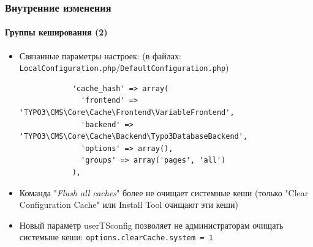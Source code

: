 \begin{frame}[fragile]
	\frametitle{Внутренние изменения}
	\framesubtitle{Группы кеширования (2)}

	\lstset{
		basicstyle=\tiny\ttfamily
	}

	\begin{itemize}

		\item Связанные параметры настроек:\newline
			\smaller(в файлах: \texttt{LocalConfiguration.php}/\texttt{DefaultConfiguration.php})\normalsize

			\begin{lstlisting}
			'cache_hash' => array(
			  'frontend' => 'TYPO3\CMS\Core\Cache\Frontend\VariableFrontend',
			  'backend' => 'TYPO3\CMS\Core\Cache\Backend\Typo3DatabaseBackend',
			  'options' => array(),
			  'groups' => array('pages', 'all')
			),
			\end{lstlisting}

		\item Команда "\textit{Flush all caches}" более не очищает системные кеши
			(только "Clear Configuration Cache" или Install Tool очищают эти кеши)
		\item Новый параметр userTSconfig позволяет не администраторам очищать системыне кеши:\newline
			\smaller\texttt{options.clearCache.system = 1}\normalsize

		\breakingchange

	\end{itemize}

\end{frame}


